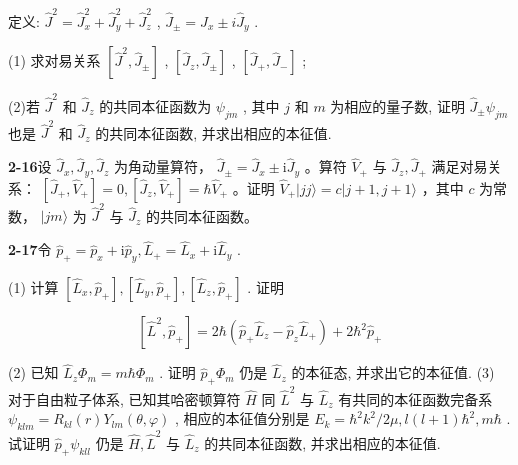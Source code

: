 定义: $\displaystyle \hat{J}^2 = \hat{J}_x^2 + \hat{J}_y^2 + \hat{J}_z^2$ , $\displaystyle \hat{J}_{\pm} = \hat{J}_x \pm i\hat{J}_y$ .

(1) 求对易关系 $\displaystyle [\hat{J}^2, \hat{J}_{\pm}]$ , $\displaystyle [\hat{J}_z, \hat{J}_{\pm}]$ , $\displaystyle [\hat{J}_{+}, \hat{J}_{-}]$ ;

(2)若 $\displaystyle \hat{J}^2$ 和 $\displaystyle \hat{J}_z$ 的共同本征函数为 $\displaystyle \psi_{jm}$ , 其中 $\displaystyle j$ 和 $\displaystyle m$ 为相应的量子数, 证明 $\displaystyle \hat{J}_{\pm} \psi_{jm}$ 也是 $\displaystyle \hat{J}^2$ 和 $\displaystyle \hat{J}_z$ 的共同本征函数, 并求出相应的本征值.

\vfill

\newpage

\textbf{2-16}\quad 设 $\displaystyle \hat{J}_x, \hat{J}_y, \hat{J}_z$ 为角动量算符， $\displaystyle \hat{J}_{\pm} = \hat{J}_x \pm \mathrm{i}\hat{J}_y$ 。算符 $\displaystyle \hat{V}_{+}$ 与 $\displaystyle \hat{J}_z, \hat{J}_{+}$ 满足对易关系： $\displaystyle [\hat{J}_{+}, \hat{V}_{+}] = 0, [\hat{J}_z, \hat{V}_{+}] = \hbar \hat{V}_{+}$ 。证明 $\displaystyle \hat{V}_{+}|jj\rangle = c|j + 1, j + 1\rangle$ ，其中 $\displaystyle c$ 为常数， $\displaystyle |jm\rangle$ 为 $\displaystyle \hat{J}^2$ 与 $\displaystyle \hat{J}_z$ 的共同本征函数。

\vfill

\newpage

\textbf{2-17}\quad 令 $\displaystyle \hat{p}_{+} = \hat{p}_{x} + \mathrm{i}\hat{p}_{y},\hat{L}_{+} = \hat{L}_{x} + \mathrm{i}\hat{L}_{y}$ .

(1) 计算 $\displaystyle [\hat{L}_x,\hat{p}_+],[\hat{L}_y,\hat{p}_+],[\hat{L}_z,\hat{p}_+]$ . 证明

$$
[ \hat {L} ^ {2}, \hat {p} _ {+} ] = 2 \hbar (\hat {p} _ {+} \hat {L} _ {z} - \hat {p} _ {z} \hat {L} _ {+}) + 2 \hbar^ {2} \hat {p} _ {+}
$$

(2) 已知 $\displaystyle \hat{L}_z\Phi_m = m\hbar \Phi_m$ . 证明 $\displaystyle \hat{p}_+ \Phi_m$ 仍是 $\displaystyle \hat{L}_z$ 的本征态, 并求出它的本征值. (3) 对于自由粒子体系, 已知其哈密顿算符 $\displaystyle \hat{H}$ 同 $\displaystyle \hat{L}^2$ 与 $\displaystyle \hat{L}_z$ 有共同的本征函数完备系 $\displaystyle \psi_{klm} = R_{kl}(r)Y_{lm}(\theta, \varphi)$ , 相应的本征值分别是 $\displaystyle E_k = \hbar^2 k^2 / 2\mu, l(l + 1)\hbar^2, m\hbar$ . 试证明 $\displaystyle \hat{p}_+ \psi_{kll}$ 仍是 $\displaystyle \hat{H}, \hat{L}^2$ 与 $\displaystyle \hat{L}_z$ 的共同本征函数, 并求出相应的本征值.

